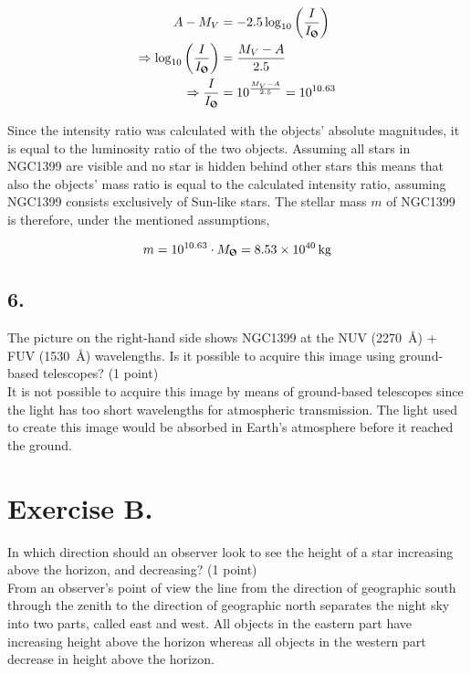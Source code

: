 \documentclass[11pt,a4paper,twoside]{article}
\begin{document}
\begin{align}
 A-M_V &= -2.5 \log_{10} \left( \frac{I}{I_{\text{\Sun}}} \right) \\
 \Rightarrow \log_{10} \left( \frac{I}{I_{\text{\Sun}}} \right) &= \frac{M_V-A}{2.5} \\
 \Rightarrow \frac{I}{I_{\text{\Sun}}} &= 10^{\frac{M_V-A}{2.5}} = 10^{10.63}
\end{align}

Since the intensity ratio was calculated with the objects' absolute magnitudes, it is equal to the luminosity ratio of the two objects. Assuming all stars in NGC1399 are visible and no star is hidden behind other stars this means that also the objects' mass ratio is equal to the calculated intensity ratio, assuming NGC1399 consists exclusively of Sun-like stars. The stellar mass $m$ of NGC1399 is therefore, under the mentioned assumptions, 

\begin{equation}
 m = 10^{10.63} \cdot M_{\text{\Sun}} = \SI{8.53e40}{\kg}
\end{equation}

\subsection*{6.} The picture on the right-hand side shows NGC1399 at the NUV (\SI{2270}{\angstrom}) + FUV (\SI{1530}{\angstrom}) wavelengths. Is it possible to acquire this image using ground-based telescopes? (1 point) \\

It is not possible to acquire this image by means of ground-based telescopes since the light has too short wavelengths for atmospheric transmission. The light used to create this image would be absorbed in Earth's atmosphere before it reached the ground. \\

\section*{Exercise B.}

In which direction should an observer look to see the height of a star increasing above the horizon, and decreasing? (1 point) \\

From an observer's point of view the line from the direction of geographic south through the zenith to the direction of geographic north separates the night sky into two parts, called east and west. All objects in the eastern part have increasing height above the horizon whereas all objects in the western part decrease in height above the horizon. \\
\end{document}
